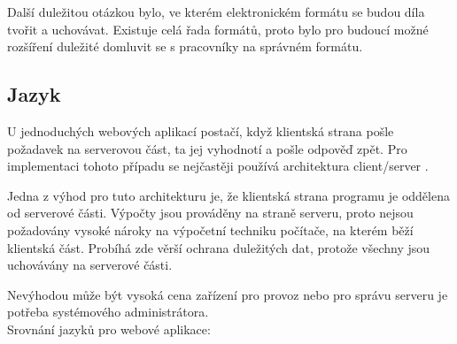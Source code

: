         Další duležitou otázkou bylo, ve kterém elektronickém formátu se budou díla tvořit a uchovávat. Existuje celá řada formátů, proto bylo pro budoucí možné rozšíření duležité domluvit se s pracovníky na správném formátu.
        
        \subsection{Jazyk}
            U jednoduchých webových aplikací postačí, když klientská strana pošle požadavek na serverovou část, ta jej vyhodnotí a pošle odpověď zpět. Pro implementaci tohoto případu se nejčastěji používá architektura client/server \cite{languages}. 
            
            Jedna z výhod pro tuto architekturu je, že klientská strana programu je oddělena od serverové části. Výpočty jsou prováděny na straně serveru, proto nejsou požadovány vysoké nároky na výpočetní techniku počítače, na kterém běží klientská část. Probíhá zde věrší ochrana duležitých dat, protože všechny jsou uchovávány na serverové části.
            
            Nevýhodou může být vysoká cena zařízení pro provoz nebo pro správu serveru je potřeba systémového administrátora.\\
            Srovnání jazyků pro webové aplikace:
            
